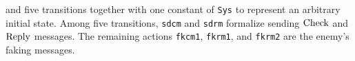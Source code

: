 \documentclass[a4paper,fleqn]{cas-dc}
\begin{document}
and five transitions together with one constant of \verb!Sys! to represent an arbitrary initial state.
Among five transitions, \verb!sdcm! and \verb!sdrm! formalize sending $\rm Check$ and $\rm Reply$ messages. The remaining actions \verb!fkcm1!, \verb!fkrm1!, and \verb!fkrm2! are the enemy's faking messages.
\end{document}
